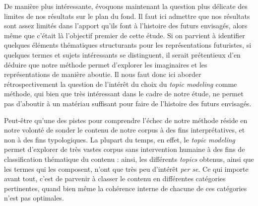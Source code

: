 \documentclass[letterpaper,portrait,12pt]{article}
\begin{document}
\textcolor[rgb]{0.000,0.000,0.000}{	De mani\`{e}re plus int\'{e}ressante, \'{e}voquons maintenant la question plus d\'{e}licate des limites de nos r\'{e}sultats sur le plan du fond. Il faut ici admettre que nos r\'{e}sultats sont assez limit\'{e}s dans l'apport qu'ils font \`{a} l'histoire des futurs envisag\'{e}s, alors m\^{e}me que c'\'{e}tait l\`{a} l'objectif premier de cette \'{e}tude. Si on parvient \`{a} identifier quelques \'{e}l\'{e}ments th\'{e}matiques structurants pour les repr\'{e}sentations futuristes, si quelques termes et sujets int\'{e}ressants se distinguent, il serait pr\'{e}tentieux d'en d\'{e}duire que notre m\'{e}thode permet d'explorer les imaginaires et les repr\'{e}sentations de mani\`{e}re aboutie. Il nous faut donc ici aborder r\'{e}trospectivement la question de l'int\'{e}r\^{e}t du choix du }\emph{\textcolor[rgb]{0.000,0.000,0.000}{topic modeling }}\textcolor[rgb]{0.000,0.000,0.000}{comme m\'{e}thode, qui bien que tr\`{e}s int\'{e}ressant dans le cadre de notre \'{e}tude, ne permet pas d'aboutir \`{a} un mat\'{e}riau suffisant pour faire de l'histoire des futurs envisag\'{e}s.}





\textcolor[rgb]{0.000,0.000,0.000}{	Peut-\^{e}tre qu'une des pistes pour comprendre l'\'{e}chec de notre m\'{e}thode r\'{e}side en notre volont\'{e} de sonder le contenu de notre corpus \`{a} des fins interpr\'{e}tatives, et non \`{a} des fins typologiques. La plupart du temps, en effet, le }\emph{\textcolor[rgb]{0.000,0.000,0.000}{topic modeling}}\textcolor[rgb]{0.000,0.000,0.000}{ permet d'explorer de tr\`{e}s vastes corpus sans intervention humaine \`{a} des fins de classification th\'{e}matique du contenu : ainsi, les diff\'{e}rents }\emph{\textcolor[rgb]{0.000,0.000,0.000}{topics}}\textcolor[rgb]{0.000,0.000,0.000}{ obtenus, ainsi que les termes qui les composent, n'ont que tr\`{e}s peu d'int\'{e}r\^{e}t }\emph{\textcolor[rgb]{0.000,0.000,0.000}{per se}}\textcolor[rgb]{0.000,0.000,0.000}{. Ce qui importe avant tout, c'est de parvenir \`{a} classer le contenu en diff\'{e}rentes cat\'{e}gories pertinentes, quand bien m\^{e}me la coh\'{e}rence interne de chacune de ces cat\'{e}gories n'est pas optimales. }
\end{document}
